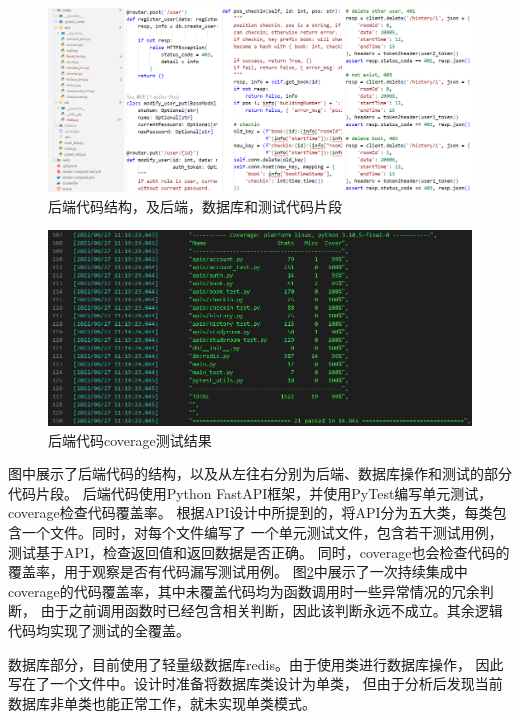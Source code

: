 \begin{figure}
    \centering
    \includegraphics[width=\textwidth]{figures/project/backend_code.png}
    \caption{后端代码结构，及后端，数据库和测试代码片段}
    \label{fig:project_backend_code}
\end{figure}

\begin{figure}
    \centering
    \includegraphics[width=\textwidth]{figures/project/coverage.png}
    \caption{后端代码coverage测试结果}
    \label{fig:project_coverage}
\end{figure}

图中展示了后端代码的结构，以及从左往右分别为后端、数据库操作和测试的部分代码片段。
后端代码使用Python FastAPI框架，并使用PyTest编写单元测试，coverage检查代码覆盖率。
根据API设计中所提到的，将API分为五大类，每类包含一个文件。同时，对每个文件编写了
一个单元测试文件，包含若干测试用例，测试基于API，检查返回值和返回数据是否正确。
同时，coverage也会检查代码的覆盖率，用于观察是否有代码漏写测试用例。
图\ref{fig:project_coverage}中展示了一次持续集成中coverage的代码覆盖率，其中未覆盖代码均为函数调用时一些异常情况的冗余判断，
由于之前调用函数时已经包含相关判断，因此该判断永远不成立。其余逻辑代码均实现了测试的全覆盖。

数据库部分，目前使用了轻量级数据库redis。由于使用类进行数据库操作，
因此写在了一个文件中。设计时准备将数据库类设计为单类，
但由于分析后发现当前数据库非单类也能正常工作，就未实现单类模式。

